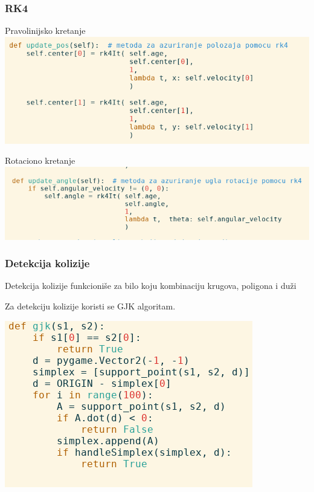\documentclass{beamer}
\begin{document}
\begin{frame}
	\frametitle{RK4}
	\begin{center}
		Pravolinijsko kretanje
		\includegraphics[scale=0.3]{./images/rk4pos.png}
		
		\vspace{0.3cm}
		Rotaciono kretanje
		\includegraphics[scale=0.3]{./images/rk4angle.png}
	\end{center}
\end{frame}

\begin{frame}
	\frametitle{Detekcija kolizije}
	Detekcija kolizije funkcioniše za bilo koju kombinaciju krugova, poligona i duži
	
	Za detekciju kolizije koristi se GJK algoritam.
	\begin{center}
		\includegraphics[scale=0.5]{./images/gjk.png}
	\end{center}
\end{frame}
\end{document}
